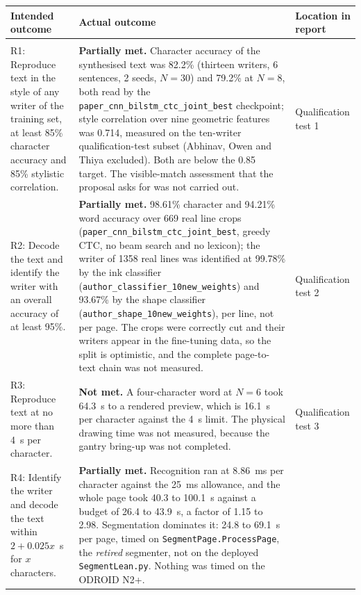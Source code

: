 \begin{table}[h]
\centering
\fontsize{10}{12}\selectfont
\begin{tabularx}{\linewidth}{|>{\raggedright\arraybackslash}p{4.6cm}|>{\raggedright\arraybackslash}X|>{\raggedright\arraybackslash}p{2.3cm}|}
\hline
\textbf{Intended outcome} & \textbf{Actual outcome} & \textbf{Location in report} \\
\hline
\multicolumn{3}{|l|}{\textbf{Core mission requirements and specifications}} \\
\hline
R1: Reproduce text in the style of any writer of the training set, at least 85\% character accuracy and 85\% stylistic correlation. &
\textbf{Partially met.} Character accuracy of the synthesised text was 82.2\% (thirteen writers, 6 sentences, 2 seeds, $N{=}30$) and 79.2\% at $N{=}8$, both read by the \texttt{paper\_cnn\_bilstm\_ctc\_joint\_best} checkpoint; style correlation over nine geometric features was 0.714, measured on the ten-writer qualification-test subset (Abhinav, Owen and Thiya excluded). Both are below the 0.85 target. The visible-match assessment that the proposal asks for was not carried out. &
Qualification test 1 \\
\hline
R2: Decode the text and identify the writer with an overall accuracy of at least 95\%. &
\textbf{Partially met.} 98.61\% character and 94.21\% word accuracy over 669 real line crops (\texttt{paper\_cnn\_bilstm\_ctc\_joint\_best}, greedy CTC, no beam search and no lexicon); the writer of 1358 real lines was identified at 99.78\% by the ink classifier (\texttt{author\_classifier\_10new\_weights}) and 93.67\% by the shape classifier (\texttt{author\_shape\_10new\_weights}), per line, not per page. The crops were correctly cut and their writers appear in the fine-tuning data, so the split is optimistic, and the complete page-to-text chain was not measured. &
Qualification test 2 \\
\hline
R3: Reproduce text at no more than 4~s per character. &
\textbf{Not met.} A four-character word at $N{=}6$ took 64.3~s to a rendered preview, which is 16.1~s per character against the 4~s limit. The physical drawing time was not measured, because the gantry bring-up was not completed. &
Qualification test 3 \\
\hline
R4: Identify the writer and decode the text within $2+0.025x$~s for $x$ characters. &
\textbf{Partially met.} Recognition ran at 8.86~ms per character against the 25~ms allowance, and the whole page took 40.3 to 100.1~s against a budget of 26.4 to 43.9~s, a factor of 1.15 to 2.98. Segmentation dominates it: 24.8 to 69.1~s per page, timed on \texttt{SegmentPage.ProcessPage}, the \emph{retired} segmenter, not on the deployed \texttt{SegmentLean.py}. Nothing was timed on the ODROID N2+. &

\end{tabularx}
\end{table}
